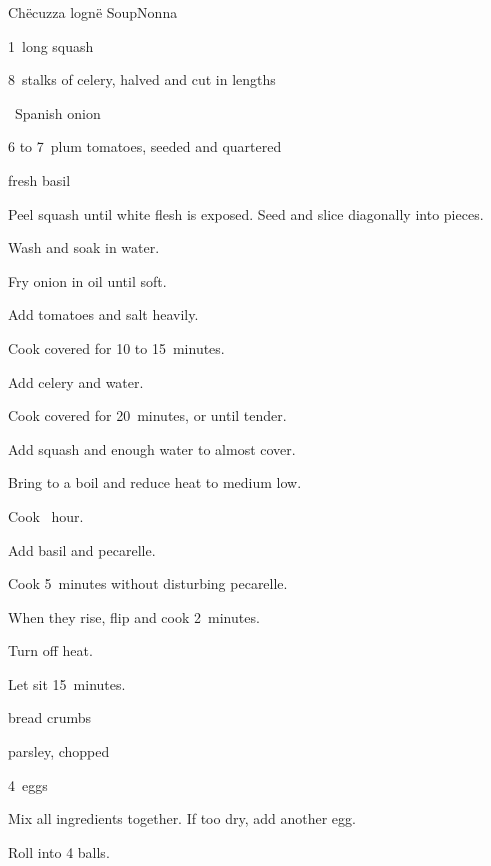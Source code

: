 \begin{recipe}{Ch\"ecuzza logn\"e Soup}{Nonna}{}

\begin{ingredients}
\item 1~long squash
\item 8~stalks of celery, halved and cut in  lengths
\item \half~Spanish onion
\item 6 to 7~plum tomatoes, seeded and quartered
\item fresh basil
\end{ingredients}

\begin{directions}
\item Peel squash until white flesh is exposed. Seed and slice diagonally into \inch{\threequarter} pieces.
\item Wash and soak in water.
\item Fry onion in oil until soft.
\item Add tomatoes and salt heavily.
\item Cook covered for 10 to 15~minutes.
\item Add celery and  water.
\item Cook covered for 20~minutes, or until tender.
\item Add squash and enough water to almost cover.
\item Bring to a boil and reduce heat to medium low.
\item Cook \half~hour.
\item Add basil and pecarelle.
\item Cook 5~minutes without disturbing pecarelle.
\item When they rise, flip and cook 2~minutes.
\item Turn off heat.
\item Let sit 15~minutes.
\end{directions}

\begin{ingredients}
\item \C{\threequarter} bread crumbs
\item {} 
\item parsley, chopped
\item 4~eggs
\end{ingredients}

\begin{directions}
\item Mix all ingredients together. If too dry, add another egg.
\item Roll into 4 balls.
\end{directions}

\end{recipe}
